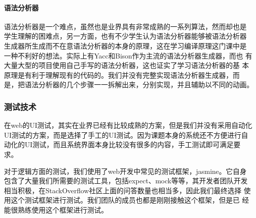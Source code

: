 \paragraph{语法分析器}
语法分析器是一个难点，虽然也是业界具有非常成熟的一系列算法，然而却也是
学生理解的困难点，另一方面，也有不少学生认为语法分析器能够被语法分析器
生成器所生成而不在意语法分析器的本身的原理，这在学习编译原理这门课中是
一种不利好的想法。实际上有Yacc和Bison作为主流的语法分析器生成器，而也
有大量大型的项目使用自己手写的语法分析器，这也证实了学习语法分析器的基
本原理是有利于理解现有的代码的。我们并没有完整实现语法分析器生成器，而
是，把语法分析器的几个步骤一一拆解出来，分别实现，并且辅助以不同的动画。
\subsubsection{测试技术}
在web的UI测试，其实在业界已经有比较成熟的方案，但是我们并没有采用自动化
UI测试的方案，而是选择了手工的UI测试。因为课题本身的系统还不方便进行自
动化的UI测试，而且系统界面本身比较没有很多的内容，手工测试即可满足要求。

对于逻辑方面的测试，我们使用了web开发中常见的测试框架，jasmine。它自身
包含了大量我们所需要的测试工具，包括expect、mock等等，其开发者团队开发
相当积极，在StackOverflow社区上面的问答数量也相当多，因此我们最终选择
使用这个测试框架进行测试。我们团队的成员也都是刚刚接触这个框架，但是已
经能很熟练使用这个框架进行测试。